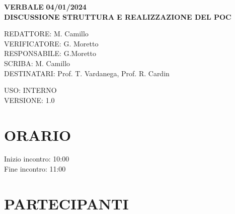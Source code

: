 \documentclass[5pt]{article}
\begin{document}
	\vspace{20pt}

	\begin{center}
		\textbf{\large VERBALE }
		\textbf{\large 04/01/2024} \\
		\textbf{\LARGE DISCUSSIONE STRUTTURA} 
			\vspace{5pt}
		\textbf{\LARGE E REALIZZAZIONE DEL POC}
	\end{center}

	\vspace{13pt}

	\begin{flushleft}
		\begin{spacing}{1.5}
			REDATTORE: M. Camillo\\%
			VERIFICATORE: G. Moretto\\%
			RESPONSABILE: G.Moretto \\%
			\vspace{7pt}
			SCRIBA: M. Camillo\\%
			\vspace{7pt}
			DESTINATARI:   Prof. T. Vardanega, Prof. R. Cardin\\%
		\end{spacing}
	\end{flushleft}

	\begin{flushright}
		\begin{spacing}{1}
			USO: INTERNO\\
			VERSIONE: 1.0\\
		\end{spacing}
	\end{flushright}


	\restoregeometry

	\pagebreak


	\section{ORARIO}
	\begin{spacing}{1.5}
		{\large Inizio incontro: 10:00}\\
		{\large Fine incontro: 11:00}
	\end{spacing}

	\section{PARTECIPANTI}
	\setlength\cellspacetoplimit{6pt}
	\setlength\cellspacebottomlimit{6pt}
\end{document}
